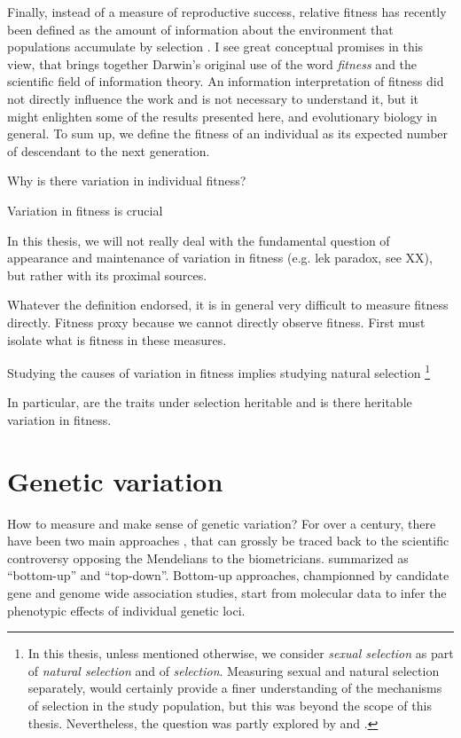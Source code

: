 Finally, instead of a measure of reproductive success, relative fitness has recently been defined as the amount of information about the environment that populations accumulate by selection \parencite{Frank2012V}. I see great conceptual promises in this view, that brings together Darwin's original use of the word \emph{fitness} and the scientific field of information theory. An information interpretation of fitness did not directly influence the work and is not necessary to understand it, but it might enlighten some of the results presented here, and evolutionary biology in general.
To sum up, we define the fitness of an individual as its expected number of descendant to the next generation.

Why is there variation in individual fitness? 

Variation in fitness is crucial 

In this thesis, we will not really deal with the fundamental question of appearance and maintenance of variation in fitness (e.g. lek paradox, see XX), but rather with its proximal sources.

Whatever the definition endorsed, it is in general very difficult to measure fitness directly. 
Fitness proxy because we cannot directly observe fitness. First must isolate what is fitness in these measures. 

Studying the causes of variation in fitness implies studying natural selection \footnote{In this thesis, unless mentioned otherwise, we consider \emph{sexual selection} as part of \emph{natural selection} and of \emph{selection}. Measuring sexual and natural selection separately, would certainly provide a finer understanding of the mechanisms of selection in the study population, but this was beyond the scope of this thesis. Nevertheless, the question was partly explored by \cite{Garcia-Navas2016} and \cite{Garcia-Navas2015a}.}

In particular, are the traits under selection heritable and is there heritable variation in fitness.


\section{Genetic variation}

How to measure and make sense of genetic variation?
For over a century, there have been two main approaches \parencite{Liedvogel2012}, that can grossly be traced back to the scientific controversy opposing the Mendelians to the biometricians.
summarized as ``bottom-up'' and ``top-down''.
Bottom-up approaches, championned by candidate gene and genome wide association studies, start from molecular data to infer the phenotypic effects of individual genetic loci. 

